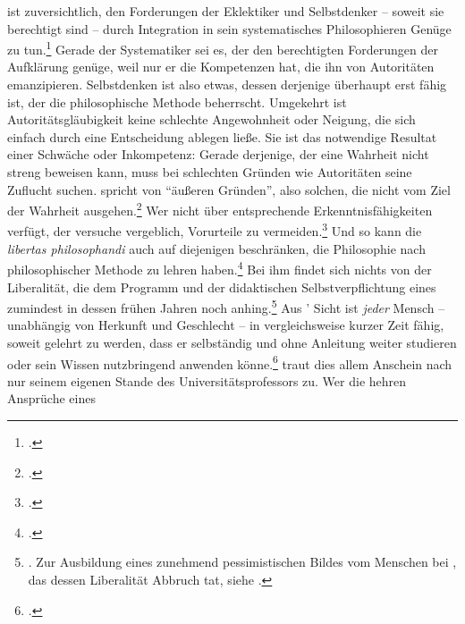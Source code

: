  ist zuversichtlich, den Forderungen der Eklektiker und Selbstdenker
-- soweit sie berechtigt sind -- durch Integration in sein systematisches
Philosophieren Genüge zu tun.\footcite[Vgl.][526--538]{Albrecht:Eklektik1994}
Gerade der Systematiker sei es, der den berechtigten Forderungen der Aufklärung
genüge, weil nur er die Kompetenzen hat, die ihn von Autoritäten emanzipieren.
Selbstdenken ist also etwas, dessen derjenige überhaupt erst fähig ist, der die
philosophische Methode beherrscht. Umgekehrt ist Autoritätsgläubigkeit keine
schlechte Angewohnheit oder Neigung, die sich einfach durch eine Entscheidung
ablegen ließe. Sie ist das notwendige Resultat einer Schwäche oder Inkompetenz:
Gerade derjenige, der eine Wahrheit nicht streng beweisen kann, muss bei
schlechten  Gründen wie Autoritäten seine Zuflucht suchen.
 spricht von \enquote{äußeren Gründen}, also solchen, die
nicht vom Ziel der Wahrheit
ausgehen.\footnote{\cite[Vgl.][\S~155]{Wolff:Discursuspraeliminarisdephilosophiaingenere1996}.}
Wer nicht über entsprechende Erkenntnisfähigkeiten verfügt, der versuche
vergeblich, Vorurteile zu
vermeiden.\footnote{\cite[Vgl.][28--31]{Wolff:OratiodeSinarumphilosophiapractica1988}.}
Und so kann  die \emph{libertas philosophandi} auch auf
diejenigen beschränken, die Philosophie nach philosophischer Methode zu lehren
haben.\footcite[Vgl.][\S~166]{Wolff:Discursuspraeliminarisdephilosophiaingenere1996}
Bei ihm findet sich nichts von der Liberalität, die dem Programm und der
didaktischen Selbstverpflichtung eines  zumindest in
dessen frühen Jahren noch
anhing.\footnote{\cite[Vgl.][241--243]{Albrecht:ChristianThomasius1999}. Zur
Ausbildung eines zunehmend pessimistischen Bildes vom Menschen bei
, das dessen Liberalität Abbruch tat, siehe
\cite{Engfer:ChristianThomasius1989}.} Aus '
Sicht ist \emph{jeder} Mensch -- unabhängig von Herkunft und Geschlecht -- in
vergleichsweise kurzer Zeit fähig, soweit gelehrt zu werden, dass er selbständig
und ohne Anleitung weiter studieren oder sein Wissen nutzbringend anwenden
könne.\footnote{\cite[Vgl.][34--36]{Thomasius:ChristianThomasiuseroeffnetDerStudirendenJugendzuLeipzigineinemDiscoursWelcherGestaltmandenenFrantzoseningemeinemLebenundWandelnachahmensolle?1994}.}
 traut dies allem Anschein nach nur seinem eigenen Stande des
Universitätsprofessors zu. Wer die hehren Ansprüche eines
